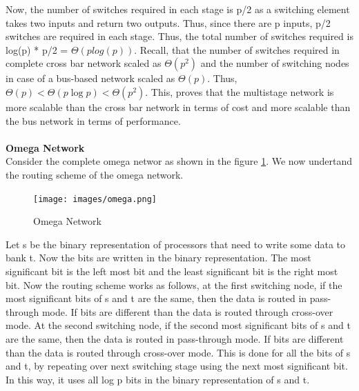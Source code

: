 \documentclass[12pt]{article}
\begin{document}
Now, the number of switches required in each stage is p/2 as a switching element takes two inputs and return two outputs. Thus, 
since there are p inputs, p/2 switches are required in each stage. Thus, the total number of switches required is log(p) * p/2 = $\Theta(plog(p))$.
Recall, that the number of switches required in complete cross bar network scaled as $\Theta(p^2)$ and the number of switching nodes in case of a bus-based network
scaled as $\Theta(p)$. Thus, $\Theta(p)<\Theta(p \log p)<\Theta(p^2)$. This, proves that the 
multistage network is more scalable than the cross bar network in terms of cost and more scalable than the bus network in terms of performance. \\
\\
\textbf{Omega Network}\\
Consider the complete omega networ as shown in the figure \ref{fig:omega}.
We now undertand the routing scheme of the omega network.
\begin{figure}[H]
    \centering
    \texttt{[image: images/omega.png]}
    \caption{Omega Network}
    \label{fig:omega}
\end{figure}
Let s be the binary representation of processors that need to write some data to bank t.
Now the bits are written in the binary representation. The most significant bit is the left most bit and the least 
significant bit is the right most bit. Now the routing scheme works as follows, at the first switching node, if the most
significant bits of s and t are the same, then the data is routed in pass-through mode. If bits are different than the data is routed through
cross-over mode. At the second switching node, if the second most significant bits of s and t are the same, then the data is routed in pass-through mode.
If bits are different than the data is routed through cross-over mode. This is done for all the bits of s and t, by repeating over 
next switching stage using the next most significant bit. In this way, it uses all log p bits in the binary representation of s and t.
\end{document}
